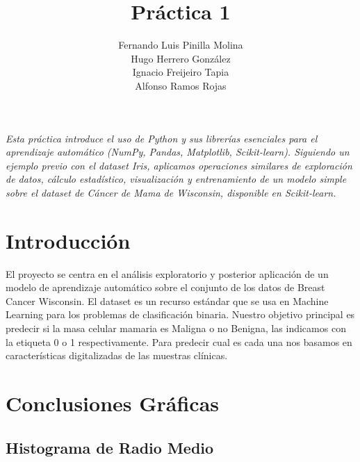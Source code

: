 \documentclass{llncs}
\begin{document}
\title{Práctica 1}

\author{Fernando Luis Pinilla Molina \\ Hugo Herrero González \\ Ignacio Freijeiro Tapia \\ Alfonso Ramos Rojas}



\maketitle 

\vspace{0.5cm} %

\textit{
Esta práctica introduce el uso de Python y sus librerías esenciales para el aprendizaje automático (NumPy, Pandas, Matplotlib, Scikit-learn). Siguiendo un ejemplo previo con el dataset Iris, aplicamos operaciones similares de exploración de datos, cálculo estadístico, visualización y entrenamiento de un modelo simple sobre el dataset de Cáncer de Mama de Wisconsin, disponible en Scikit-learn.}

\section{Introducción}
El proyecto se centra en el análisis exploratorio y posterior aplicación de un modelo de aprendizaje automático sobre el conjunto de los datos de Breast Cancer Wisconsin. El dataset es un recurso estándar que se usa en Machine Learning para los problemas de clasificación binaria.
Nuestro objetivo principal es predecir si la masa celular mamaria es Maligna o no Benigna, las indicamos con la etiqueta 0 o 1 respectivamente. Para predecir cual es cada una nos basamos en características digitalizadas de las muestras clínicas.

\vspace{0.5cm}


\section{Conclusiones Gráficas}

\subsection{Histograma de Radio Medio}
\end{document}
